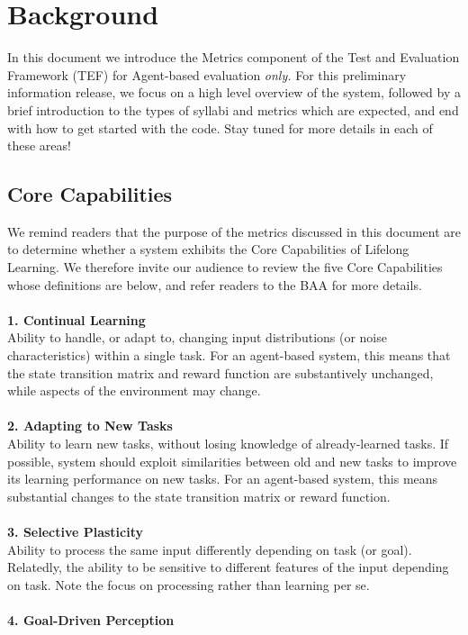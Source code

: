 \chapter{Background}\label{ch:background}

In this document we introduce the Metrics component of the Test and Evaluation Framework (TEF) for Agent-based evaluation \textit{only.} For this preliminary information release, we focus on a high level overview of the system, followed by a brief introduction to the types of syllabi and metrics which are expected, and end with how to get started with the code. Stay tuned for more details in each of these areas!

\section{Core Capabilities}
\label{sec:core_capabilities}

We remind readers that the purpose of the metrics discussed in this document are to determine whether a system exhibits the Core Capabilities of Lifelong Learning. We therefore invite our audience to review the five Core Capabilities whose definitions are below, and refer readers to the BAA for more details.\\%
\\
\textbf{1. Continual Learning}\\

Ability to handle, or adapt to, changing input distributions (or noise characteristics) within a single task. For an agent-based system, this means that the state transition matrix and reward function are substantively unchanged, while aspects of the environment may change.\\
\\
\textbf{2. Adapting to New Tasks}\\

Ability to learn new tasks, without losing knowledge of already-learned tasks. If possible, system should exploit similarities between old and new tasks to improve its learning performance on new tasks. For an agent-based system, this means substantial changes to the state transition matrix or reward function.\\
\\
\textbf{3. Selective Plasticity}\\

Ability to process the same input differently depending on task (or goal). Relatedly, the ability to be sensitive to different features of the input depending on task. Note the focus on processing rather than learning per se.\\
\\
\textbf{4. Goal-Driven Perception}\\

